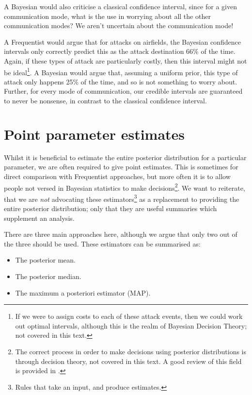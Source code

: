 \documentclass[11pt,fullpage]{book}
\begin{document}
A Bayesian would also criticise a classical confidence interval, since for a given communication mode, what is the use in worrying about all the other communication modes? We aren't uncertain about the communication mode!

A Frequentist would argue that for attacks on airfields, the Bayesian confidence intervals only correctly predict this as the attack destination 66\% of the time. Again, if these types of attack are particularly costly, then this interval might not be ideal\footnote{If we were to assign costs to each of these attack events, then we could work out optimal intervals, although this is the realm of Bayesian Decision Theory; not covered in this text.}. A Bayesian would argue that, assuming a uniform prior, this type of attack only happens 25\% of the time, and so is not something to worry about. Further, for every mode of communication, our credible intervals are guaranteed to never be nonsense, in contrast to the classical confidence interval.

\section{Point parameter estimates}
Whilst it is beneficial to estimate the entire posterior distribution for a particular parameter, we are often required to give point estimates. This is sometimes for direct comparison with Frequentist approaches, but more often it is to allow people not versed in Bayesian statistics to make decisions\footnote{The correct process in order to make decisions using posterior distributions is through decision theory, not covered in this text. A good review of this field is provided in \cite{robert2007bayesian}.}. We want to reiterate, that we are \textit{not} advocating these estimators\footnote{Rules that take an input, and produce estimates.} as a replacement to providing the entire posterior distribution; only that they are useful summaries which supplement an analysis.

There are three main approaches here, although we argue that only two out of the three should be used. These estimators can be summarised as:

\begin{itemize}
\item The posterior mean.
\item The posterior median.
\item The maximum a posteriori estimator (MAP).
\end{itemize}
\end{document}
